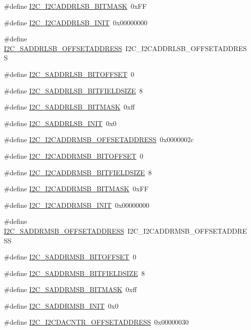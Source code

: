 \begin{DoxyCompactItemize}
\item 
\#define \hyperlink{a00558_aa6d87c8f028825d61b900c0173e3258f}{I2C\_\-I2CADDRLSB\_\-BITMASK}~0xFF
\item 
\#define \hyperlink{a00558_a0102dd5fc9475784743c5d387cd23674}{I2C\_\-I2CADDRLSB\_\-INIT}~0x00000000
\item 
\#define \hyperlink{a00558_abe808ef4b9bafe94833885f7ec15d731}{I2C\_\-SADDRLSB\_\-OFFSETADDRESS}~I2C\_\-I2CADDRLSB\_\-OFFSETADDRESS
\item 
\#define \hyperlink{a00558_a48fb6df5ede5f01b1d6163e7284fe678}{I2C\_\-SADDRLSB\_\-BITOFFSET}~0
\item 
\#define \hyperlink{a00558_a2d6dba1eb00fbf75207498c4c10f5630}{I2C\_\-SADDRLSB\_\-BITFIELDSIZE}~8
\item 
\#define \hyperlink{a00558_a1ddb8da00e54b366483b6517cc51daf5}{I2C\_\-SADDRLSB\_\-BITMASK}~0xff
\item 
\#define \hyperlink{a00558_a46e66a82cf6769b26a5df0131a9329af}{I2C\_\-SADDRLSB\_\-INIT}~0x0
\item 
\#define \hyperlink{a00558_aedb5f0cabb0e28667024bf455f21aaf6}{I2C\_\-I2CADDRMSB\_\-OFFSETADDRESS}~0x0000002c
\item 
\#define \hyperlink{a00558_a6c750eedbf25a8e2f62e928956160349}{I2C\_\-I2CADDRMSB\_\-BITOFFSET}~0
\item 
\#define \hyperlink{a00558_ac4b5182d5d9d1d9feb6fc4badf94cdf5}{I2C\_\-I2CADDRMSB\_\-BITFIELDSIZE}~8
\item 
\#define \hyperlink{a00558_a118e241677d9c64bfd867c65b9f466b9}{I2C\_\-I2CADDRMSB\_\-BITMASK}~0xFF
\item 
\#define \hyperlink{a00558_a70389a1f27094754e4a394feaeb04371}{I2C\_\-I2CADDRMSB\_\-INIT}~0x00000000
\item 
\#define \hyperlink{a00558_a096049abd13309f06e39d53741cd8c53}{I2C\_\-SADDRMSB\_\-OFFSETADDRESS}~I2C\_\-I2CADDRMSB\_\-OFFSETADDRESS
\item 
\#define \hyperlink{a00558_ad2b146b17cc4beb07a3abeb973e2ba82}{I2C\_\-SADDRMSB\_\-BITOFFSET}~0
\item 
\#define \hyperlink{a00558_a37670e88f72b7a2adc059f464ce1daca}{I2C\_\-SADDRMSB\_\-BITFIELDSIZE}~8
\item 
\#define \hyperlink{a00558_a7ac576e2bbf84d1555618cca46619b0d}{I2C\_\-SADDRMSB\_\-BITMASK}~0xff
\item 
\#define \hyperlink{a00558_a33ca88d59412594c6c915e0a58e7c358}{I2C\_\-SADDRMSB\_\-INIT}~0x0
\item 
\#define \hyperlink{a00558_ac9b397b71b0b64bf13372c7a5272c514}{I2C\_\-I2CDACNTR\_\-OFFSETADDRESS}~0x00000030

\end{DoxyCompactItemize}
